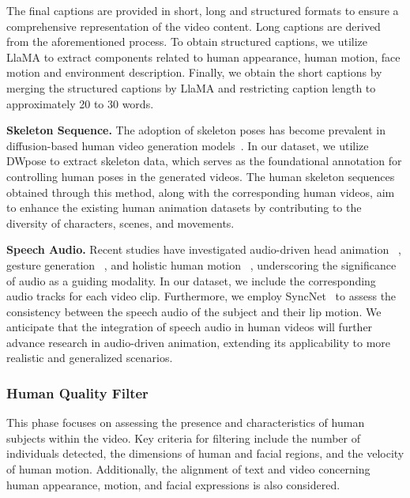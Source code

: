 The final captions are provided in short, long and structured formats to ensure a comprehensive representation of the video content. 
Long captions are derived from the aforementioned process. 
To obtain structured captions, we utilize LlaMA to extract components related to human appearance, human motion, face motion and environment description. 
Finally, we obtain the short captions by merging the structured captions by LlaMA and restricting caption length to approximately 20 to 30 words.





\noindent\textbf{Skeleton Sequence.}  
The adoption of skeleton poses has become prevalent in diffusion-based human video generation models~\cite{zhu2024champ,chang2023magicpose,hu2024animate}. 
In our dataset, we utilize DWpose to extract skeleton data, which serves as the foundational annotation for controlling human poses in the generated videos. 
The human skeleton sequences obtained through this method, along with the corresponding human videos, aim to enhance the existing human animation datasets by contributing to the diversity of characters, scenes, and movements.


\noindent\textbf{Speech Audio.}  
Recent studies have investigated audio-driven head animation ~\cite{xu2024hallo,xu2024vasa,he2023gaia}, gesture generation ~\cite{yang2023qpgesture,zhu2023taming}, and holistic human motion ~\cite{corona2024vlogger,wang2024dance}, underscoring the significance of audio as a guiding modality. 
In our dataset, we include the corresponding audio tracks for each video clip. 
Furthermore, we employ SyncNet~\cite{raina2022syncnet} to assess the consistency between the speech audio of the subject and their lip motion. 
We anticipate that the integration of speech audio in human videos will further advance research in audio-driven animation, extending its applicability to more realistic and generalized scenarios.





\subsubsection{Human Quality Filter}
\label{sec:caption_refine}

This phase focuses on assessing the presence and characteristics of human subjects within the video. Key criteria for filtering include the number of individuals detected, the dimensions of human and facial regions, and the velocity of human motion. Additionally, the alignment of text and video concerning human appearance, motion, and facial expressions is also considered.






